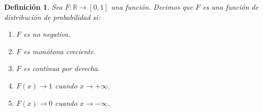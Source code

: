 \documentclass{report}
\newtheorem{thm}{Teorema}[section]
\newtheorem{dfn}{Definición}[section]
\begin{document}
%

\begin{dfn}
Sea $F:\mathbb{R}\rightarrow[0,1]$ una función. Decimos que $F$ es una \emph{función de distribución de probabilidad} si:
\begin{enumerate}
\item $F$ es no negativa.
\item $F$ es monótona creciente.
\item $F$ es continua por derecha.
\item $F(x)\rightarrow 1$ cuando $x\rightarrow +\infty$.
\item $F(x)\rightarrow 0$ cuando $x\rightarrow -\infty$.
\end{enumerate}
\end{dfn}
\end{document}
